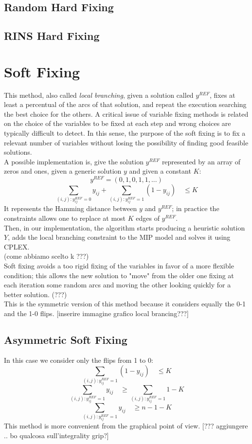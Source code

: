 \subsection{Random Hard Fixing}

\subsection{RINS Hard Fixing}



\section{Soft Fixing}
This method, also called \textit{local branching}, given a solution called $y^{REF}$, fixes at least a percentual of the arcs of that solution, and repeat the execution searching the best choice for the others. A critical issue of variable fixing methods is related on the choice of the variables to be fixed at each step and wrong choices are typically difficult to detect. In this sense, the purpose of the soft fixing is to fix a relevant number of variables without losing the possibility of finding good feasible solutions.\\
A possible implementation is, give the solution $y^{REF}$ represented by an array of zeros and ones, given a generic solution $y$ and given a constant $K$:
\[
	y^{REF} = (0,1,0,1,1,...)
\]
\[
	\sum_{(i,j):y^{REF}_{ij}=0} y_{ij} + \sum_{(i,j):y^{REF}_{ij}=1} (1-y_{ij}) \quad \leq K
\]
It represents the Hamming distance between $y$ and $y^{REF}$; in practice the constraints allows one to replace at most $K$ edges of $y^{REF}$. \\
Then, in our implementation, the algorithm starts producing a heuristic solution $Y$, adds the local branching constraint to the MIP model and solves it using \textsc{CPLEX}.\\ (come abbiamo scelto k ???)\\
Soft fixing avoids a too rigid fixing of the variables in favor of a more flexible condition; this allows the new solution to "move" from the older one fixing at each iteration some random arcs and moving the other looking quickly for a better solution. (???)\\
This is the symmetric version of this method because it considers equally the 0-1 and the 1-0 flips. 
[inserire immagine grafico local brancing???]
\subsection{Asymmetric Soft Fixing}
In this case we consider only the flips from 1 to 0:
\[
	\sum_{(i,j):y^{REF}_{ij}=1} (1-y_{ij}) \quad \leq K
\]
\[
	\sum_{(i,j):y^{REF}_{ij}=1} y_{ij} \quad \geq \sum_{(i,j):y^{REF}_{ij}=1} 1 - K
\]
\[
	\sum_{(i,j):y^{REF}_{ij}=1} y_{ij} \quad \geq n - 1 - K
\]
This method is more convenient from the graphical point of view. 
[??? aggiungere .. bo qualcosa sull'integrality grip?]
